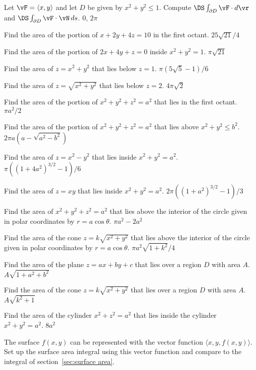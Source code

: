\begin{multicols}{2}
\problem Let $\vF =\langle x,y\rangle$ and  %
let $D$ be given by $x^2+y^2\le 1$.
Compute $\DS\int_{\partial D} \vF \cdot d\vr $ and
$\DS\int_{\partial D} \vF \cdot\vN \,ds$.
\answer
$0$, $2\pi$
\endanswer






\problem Find the area of the portion of $x+2y+4z=10$ in the first %
octant.
\answer
$25\sqrt{21}/4$
\endanswer

\problem Find the area of the portion of $2x+4y+z=0$ %
inside $x^2+y^2=1$.
\answer
$\pi\sqrt{21}$
\endanswer

\problem Find the area of $z=x^2+y^2$ that lies below $z=1$. %
\answer
$\pi(5\sqrt5-1)/6$
\endanswer

\problem Find the area of $z=\sqrt{x^2+y^2}$ that lies below $z=2$. %
\answer
$4\pi\sqrt2$
\endanswer

\problem Find the area of the portion of $x^2+y^2+z^2=a^2$ that lies %
in the first octant.
\answer
$\pi a^2/2$
\endanswer

\problem Find the area of the portion of $x^2+y^2+z^2=a^2$ that lies %
above $x^2+y^2\le b^2$.
\answer
$2\pi a(a-\sqrt{a^2-b^2})$
\endanswer

\problem Find the area of $z=x^2-y^2$ that lies inside $x^2+y^2=a^2$. %
\answer
$\pi((1+4a^2)^{3/2}-1)/6$
\endanswer

\problem Find the area of $z=xy$ that lies inside $x^2+y^2=a^2$. %
\answer
$2\pi((1+a^2)^{3/2}-1)/3$
\endanswer

\problem Find the area of $x^2+y^2+z^2=a^2$  %
that lies above the interior of the circle given in polar coordinates
by $r=a\cos \theta$.
\answer
$\pi a^2-2a^2$
\endanswer

\problem Find the area of the cone $z=k\sqrt{x^2+y^2}$ %
that lies above the interior of the circle given in polar coordinates
by $r=a\cos \theta$.
\answer
$\pi a^2\sqrt{1+k^2}/4$
\endanswer

\problem Find the area of the plane $z=ax+by+c$ that lies over a %
region $D$ with area $A$.
\answer
$A\sqrt{1+a^2+b^2}$
\endanswer

\problem Find the area of the cone $z=k\sqrt{x^2+y^2}$ that lies over a %
region $D$ with area $A$.
\answer
$A\sqrt{k^2+1}$
\endanswer

\problem Find the area of the cylinder $x^2+z^2=a^2$ that lies inside %
the cylinder $x^2+y^2=a^2$.
\answer
$8a^2$
\endanswer

\problem The surface $f(x,y)$ can be represented with the vector %
function $\langle x,y,f(x,y)\rangle$. Set up the surface area integral using
this vector function and compare to the integral of
section~\ref{sec:surface area}. 






\end{multicols}
